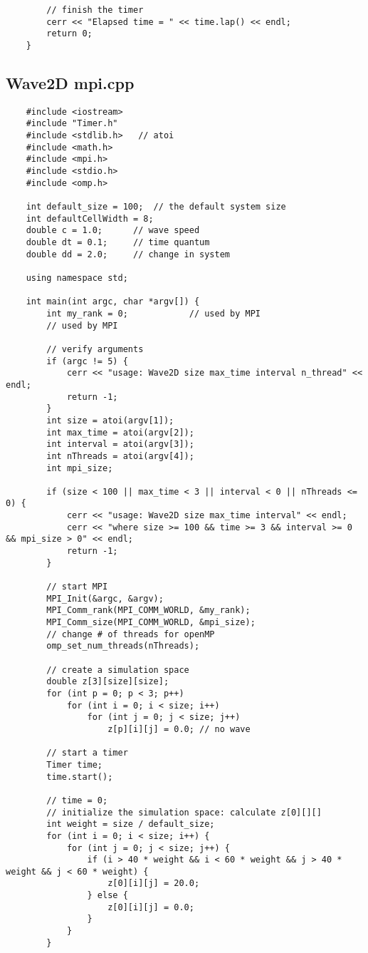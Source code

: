 \documentclass[11pt, letterpaper]{article}
\begin{document}
\begin{lstlisting}
		// finish the timer
		cerr << "Elapsed time = " << time.lap() << endl;
		return 0;
	}
	\end{lstlisting}
	\pagebreak
	
	\subsection{Wave2D mpi.cpp}
	\vspace{-0.2in}
	\begin{lstlisting}
	#include <iostream>
	#include "Timer.h"
	#include <stdlib.h>   // atoi
	#include <math.h>
	#include <mpi.h>
	#include <stdio.h>
	#include <omp.h>
	
	int default_size = 100;  // the default system size
	int defaultCellWidth = 8;
	double c = 1.0;      // wave speed
	double dt = 0.1;     // time quantum
	double dd = 2.0;     // change in system
	
	using namespace std;
	
	int main(int argc, char *argv[]) {
		int my_rank = 0;            // used by MPI
		// used by MPI
		
		// verify arguments
		if (argc != 5) {
			cerr << "usage: Wave2D size max_time interval n_thread" << endl;
			return -1;
		}
		int size = atoi(argv[1]);
		int max_time = atoi(argv[2]);
		int interval = atoi(argv[3]);
		int nThreads = atoi(argv[4]);
		int mpi_size;
		
		if (size < 100 || max_time < 3 || interval < 0 || nThreads <= 0) {
			cerr << "usage: Wave2D size max_time interval" << endl;
			cerr << "where size >= 100 && time >= 3 && interval >= 0 && mpi_size > 0" << endl;
			return -1;
		}
		
		// start MPI
		MPI_Init(&argc, &argv);
		MPI_Comm_rank(MPI_COMM_WORLD, &my_rank);
		MPI_Comm_size(MPI_COMM_WORLD, &mpi_size);
		// change # of threads for openMP
		omp_set_num_threads(nThreads);
		
		// create a simulation space
		double z[3][size][size];
		for (int p = 0; p < 3; p++)
			for (int i = 0; i < size; i++)
				for (int j = 0; j < size; j++)
					z[p][i][j] = 0.0; // no wave
		
		// start a timer
		Timer time;
		time.start();
		
		// time = 0;
		// initialize the simulation space: calculate z[0][][]
		int weight = size / default_size;
		for (int i = 0; i < size; i++) {
			for (int j = 0; j < size; j++) {
				if (i > 40 * weight && i < 60 * weight && j > 40 * weight && j < 60 * weight) {
					z[0][i][j] = 20.0;
				} else {
					z[0][i][j] = 0.0;
				}
			}
		}
		

\end{lstlisting}
\end{document}
